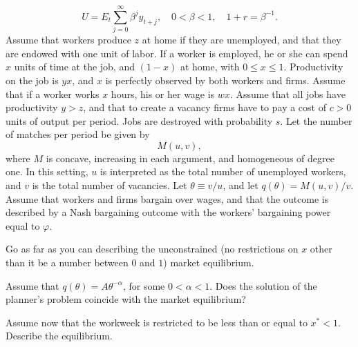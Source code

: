 $$ U = E_t \sum_{j=0}^\infty \beta^j y_{t+j}, \quad
0 < \beta < 1, \quad
1 + r = \beta^{-1}.  $$
 \noindent
Assume that workers produce $z$ at home if they are unemployed, and that they are
endowed with one unit of labor.  If a worker is employed, he or she can spend $x$ units
of time at the job, and $(1-x)$ at home, with $0\leq x \leq 1$.  Productivity on the
job is $yx$, and $x$ is perfectly observed by both workers and firms.
\medskip
\noindent
Assume that if a worker works $x$ hours, his or her wage is $wx$.
\medskip
\noindent
Assume that all jobs have productivity $y>z$, and that to create a vacancy
firms have to pay a cost of $c>0$ units of output per period.  Jobs are destroyed
with probability $s$.  Let the number of matches per period be given by
$$ M(u,v),  $$
where $M$ is concave, increasing in each argument, and homogeneous of degree one.
In this setting, $u$ is interpreted as the total number of unemployed workers,
and $v$ is the total number of vacancies.  Let $\theta \equiv v/u$, and let
$q(\theta) = M(u,v)/v$.
\medskip
\noindent
Assume that workers and firms bargain over wages, and that the outcome is
described by a Nash bargaining outcome with the workers' bargaining power
equal to $\varphi$.
\medskip

 Go as far as you can describing the unconstrained (no restrictions on
$x$ other than it be a number between $0$ and $1$) market equilibrium.
\medskip

 Assume that $q(\theta) = A\theta^{-\alpha}$, for some $0 < \alpha < 1$.
Does the solution of the planner's problem coincide with the market equilibrium?
\medskip

 Assume now that the workweek is restricted to be less than or
equal to $x^* < 1$.  Describe the equilibrium.
\medskip

